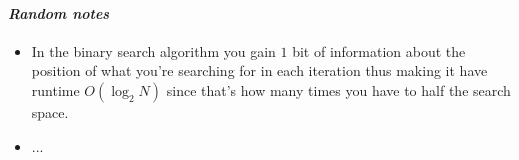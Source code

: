 \paragraph{\textit{Random notes}}
\begin{itemize}
    \item
        In the binary search algorithm you gain $1$ bit of information about the position of what you're searching for in each iteration thus making it have runtime $O(\log_2{N})$ since that's how many times you have to half the search space.
    \item ...
\end{itemize}

